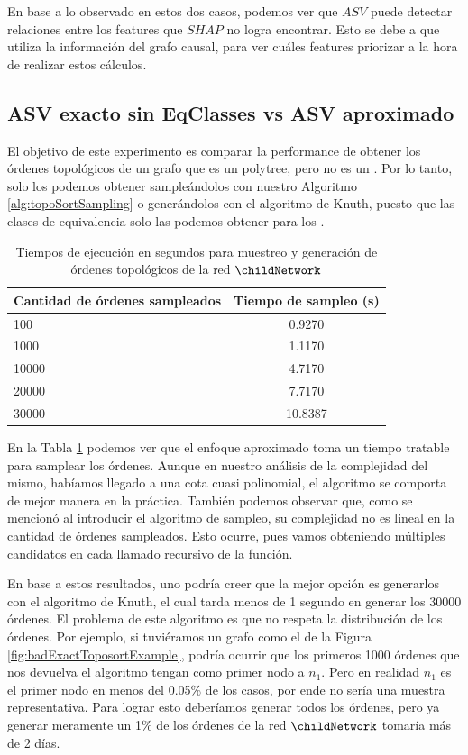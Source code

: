 En base a lo observado en estos dos casos, podemos ver que $ASV$ puede detectar relaciones entre los features que $SHAP$ no logra encontrar. Esto se debe a que utiliza la información del grafo causal, para ver cuáles features priorizar a la hora de realizar estos cálculos. 

\subsection{ASV exacto sin EqClasses vs ASV aproximado}

El objetivo de este experimento es comparar la performance de obtener los órdenes topológicos de un grafo que es un polytree, pero no es un \dtree. Por lo tanto, solo los podemos obtener sampleándolos con nuestro Algoritmo \ref{alg:topoSortSampling} o generándolos con el algoritmo de Knuth, puesto que las clases de equivalencia solo las podemos obtener para los \dtrees.

\begin{table}[h]
	\centering
	\begin{tabular}{|l|c|}
		\hline
		\textbf{Cantidad de órdenes sampleados} & \textbf{Tiempo de sampleo (s)}\\
		\hline
		100 & 0.9270 \\
		1000 & 1.1170 \\
		10000 & 4.7170 \\
		20000 & 7.7170 \\
		30000 & 10.8387 \\
		\hline
	\end{tabular}
	
	\caption{Tiempos de ejecución en segundos para muestreo y generación de órdenes topológicos de la red $\childNetwork$}
	\label{table:exactVsApproximateTopoSorts}
\end{table}

En la Tabla \ref{table:exactVsApproximateTopoSorts} podemos ver que el enfoque aproximado toma un tiempo tratable para samplear los órdenes. Aunque en nuestro análisis de la complejidad del mismo, habíamos llegado a una cota cuasi polinomial, el algoritmo se comporta de mejor manera en la práctica. También podemos observar que, como se mencionó al introducir el algoritmo de sampleo, su complejidad no es lineal en la cantidad de órdenes sampleados. Esto ocurre, pues vamos obteniendo múltiples candidatos en cada llamado recursivo de la función. 

En base a estos resultados, uno podría creer que la mejor opción es generarlos con el algoritmo de Knuth, el cual tarda menos de 1 segundo en generar los 30000 órdenes. El problema de este algoritmo es que no respeta la distribución de los órdenes.  Por ejemplo, si tuviéramos un grafo como el de la Figura \ref{fig:badExactToposortExample}, podría ocurrir que los primeros 1000 órdenes que nos devuelva el algoritmo tengan como primer nodo a $n_1$. Pero en realidad $n_1$ es el primer nodo en menos del 0.05\% de los casos, por ende no sería una muestra representativa. Para lograr esto deberíamos generar todos los órdenes, pero ya generar meramente un 1\% de los órdenes de la red $\childNetwork$ tomaría más de 2 días. 

